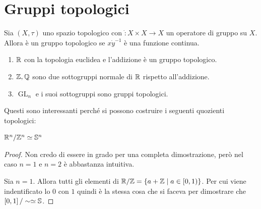 \section{Gruppi topologici}

\begin{definition}
	Sia $(X, \tau)$ uno spazio topologico con $\dot \colon X \times X \rightarrow X$ un operatore di gruppo su $X$. Allora è un gruppo topologico se $x \dot y^{-1}$ è una funzione continua.
\end{definition}

\begin{example}
\begin{enumerate}
	\item $\R$ con la topologia euclidea e l'addizione è un gruppo topologico.
	\item $\Z, \Q$ sono due sottogruppi normale di $\R$ rispetto all'addizione. 
	\item $\operatorname{GL}_n$ e i suoi sottogruppi sono gruppi topologici.
\end{enumerate}
\end{example}

Questi sono interessanti perché si possono costruire i seguenti quozienti topologici:
\begin{theorem}
	$\R^n / \Z^n \simeq \S^n$
\end{theorem}
\begin{proof}
	Non credo di essere in grado per una completa dimostrazione, però nel caso $n=1$ e $n=2$ è abbastanza intuitiva.
	
	Sia $n=1$. Allora tutti gli elementi di $\R / \Z = \{a + \Z \; |\; a \in \left[0,1\right) \}$.  
	Per cui viene indentificato lo $0$ con $1$ quindi è la stessa cosa che si faceva per dimostrare che $\left[0,1\right]/ \sim \simeq \S$. 
\end{proof}

